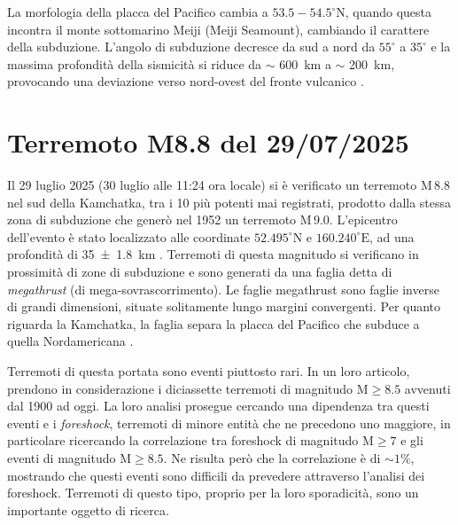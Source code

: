 La morfologia della placca del Pacifico cambia a \(53.5-54.5 ^\circ \text{N}\), quando questa incontra il monte sottomarino Meiji (Meiji Seamount), cambiando il carattere della subduzione. L'angolo di subduzione decresce da sud a nord da \(55 ^\circ\) a \(35 ^\circ\) e la massima profondità della sismicità si riduce da \(\sim\) \qty{600}{\kilo\meter} a \(\sim\) \qty{200}{\kilo\meter}, provocando una deviazione verso nord-ovest del fronte vulcanico \citep{description, usgs2025qw60}.


\section{Terremoto M8.8 del 29/07/2025}

Il 29 luglio 2025 (30 luglio alle 11:24 ora locale) si è verificato un terremoto \(\mathrm{M}\,8.8\) nel sud della Kamchatka, tra i 10 più potenti mai registrati, prodotto dalla stessa zona di subduzione che generò nel 1952 un terremoto \(\mathrm{M}\,9.0\).
L'epicentro dell'evento è stato localizzato alle coordinate \(52.495^\circ \text{N}\) e \(160.240^\circ \text{E}\), ad una profondità di \qty{35 +- 1.8}{\kilo\meter} \citep{usgs2025qw60}.
Terremoti di questa magnitudo si verificano in prossimità di zone di subduzione e sono generati da una faglia detta di \textit{megathrust} (di mega-sovrascorrimento). Le faglie megathrust sono faglie inverse di grandi dimensioni, situate solitamente lungo margini convergenti. Per quanto riguarda la Kamchatka, la faglia separa la placca del Pacifico che subduce a quella Nordamericana \citep{hubbardstrikeskamchatka}. 

Terremoti di questa portata sono eventi piuttosto rari. In un loro articolo, \citet{hubbardfirstlook} prendono in considerazione i diciassette terremoti di magnitudo \(\mathrm{M}\ge 8.5\) avvenuti dal 1900 ad oggi. La loro analisi prosegue cercando una dipendenza tra questi eventi e i \textit{foreshock}, terremoti di minore entità che ne precedono uno maggiore, in particolare ricercando la correlazione tra foreshock di magnitudo \(\mathrm{M} \ge 7\) e gli eventi di magnitudo  \(\mathrm{M} \ge 8.5\).
Ne risulta però che la correlazione è di \(\sim1 \%\), mostrando che questi eventi sono difficili da prevedere attraverso l'analisi dei foreshock. 
Terremoti di questo tipo, proprio per la loro sporadicità, sono un importante oggetto di ricerca.

